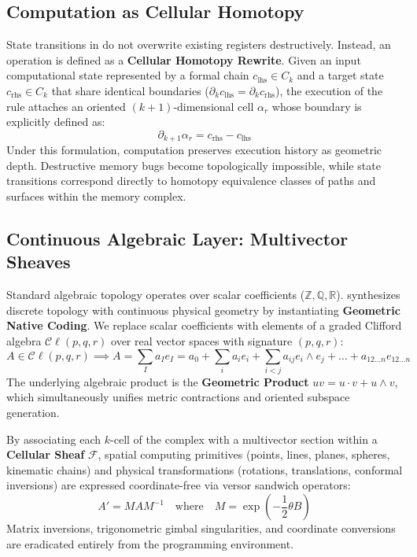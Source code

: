 \subsection{Computation as Cellular Homotopy}
State transitions in \ToposLang{} do not overwrite existing registers destructively. Instead, an operation is defined as a \textbf{Cellular Homotopy Rewrite}. Given an input computational state represented by a formal chain $c_{\text{lhs}} \in C_k$ and a target state $c_{\text{rhs}} \in C_k$ that share identical boundaries ($\partial_k c_{\text{lhs}} = \partial_k c_{\text{rhs}}$), the execution of the rule attaches an oriented $(k+1)$-dimensional cell $\alpha_r$ whose boundary is explicitly defined as:
\begin{equation}
    \partial_{k+1} \alpha_r = c_{\text{rhs}} - c_{\text{lhs}}
\end{equation}
Under this formulation, computation preserves execution history as geometric depth. Destructive memory bugs become topologically impossible, while state transitions correspond directly to homotopy equivalence classes of paths and surfaces within the memory complex.

\subsection{Continuous Algebraic Layer: Multivector Sheaves}
Standard algebraic topology operates over scalar coefficients ($\mathbb{Z}, \mathbb{Q}, \mathbb{R}$). \ToposLang{} synthesizes discrete topology with continuous physical geometry by instantiating \textbf{Geometric Native Coding}. We replace scalar coefficients with elements of a graded Clifford algebra $\mathcal{C}\ell(p,q,r)$ over real vector spaces with signature $(p,q,r)$:
\begin{equation}
    A \in \mathcal{C}\ell(p,q,r) \implies A = \sum_{I} a_I e_I = a_0 + \sum_i a_i e_i + \sum_{i<j} a_{ij} e_i \wedge e_j + \dots + a_{12\dots n} e_{12\dots n}
\end{equation}
The underlying algebraic product is the \textbf{Geometric Product} $uv = u \cdot v + u \wedge v$, which simultaneously unifies metric contractions and oriented subspace generation.

By associating each $k$-cell of the complex with a multivector section within a \textbf{Cellular Sheaf} $\mathcal{F}$, spatial computing primitives (points, lines, planes, spheres, kinematic chains) and physical transformations (rotations, translations, conformal inversions) are expressed coordinate-free via versor sandwich operators:
\begin{equation}
    A' = M A M^{-1} \quad \text{where} \quad M = \exp\left(-\frac{1}{2}\theta B\right)
\end{equation}
Matrix inversions, trigonometric gimbal singularities, and coordinate conversions are eradicated entirely from the programming environment.

